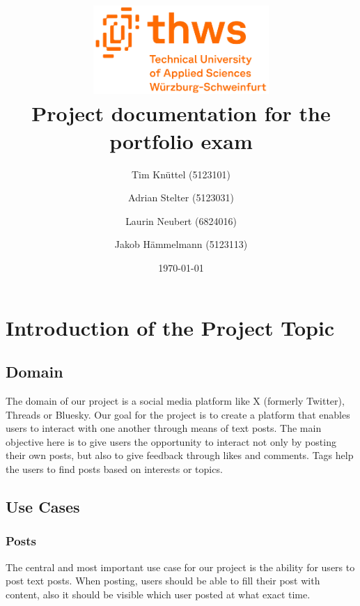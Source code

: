 \documentclass[a4paper, 11pt]{article}
\begin{document}
    \title{\vspace{-3cm}\includegraphics[width=0.5\textwidth]{thws.png}\\ Project documentation for the portfolio exam}
    \date{\today}
    \author{Tim Knüttel (5123101) \and Adrian Stelter (5123031) \and Laurin Neubert (6824016) \and Jakob Hämmelmann (5123113)}



    \maketitle


    \section{Introduction of the Project Topic}\label{sec:introduction-of-the-project-topic}

    \subsection{Domain}\label{subsec:domain}
    The domain of our project is a social media platform like X (formerly Twitter), Threads or Bluesky.
    Our goal for the project is to create a platform that enables users to interact with one another through means of text posts.
    The main objective here is to give users the opportunity to interact not only by posting their own posts, but also to give feedback through likes and comments.
    Tags help the users to find posts based on interests or topics.

    \subsection{Use Cases}\label{subsec:use-cases}

    \subsubsection{Posts}
    The central and most important use case for our project is the ability for users to post text posts. When posting, users should be able to fill their post with content, also it should be visible which user posted at what exact time.
\end{document}
